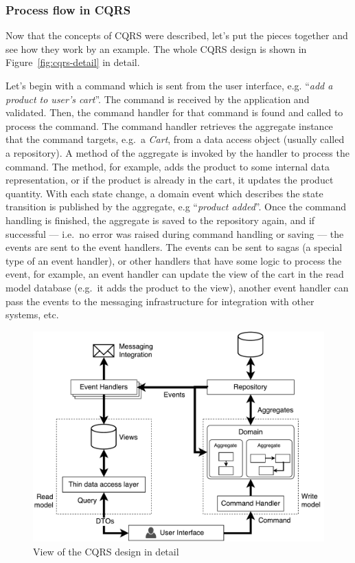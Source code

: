 \documentclass{book}
\begin{document}
\subsubsection{Process flow in CQRS}\label{process-flow-in-cqrs}

Now that the concepts of CQRS were described, let's put the pieces
together and see how they work by an example. The whole CQRS design is
shown in Figure~\ref{fig:cqrs-detail} in detail.

Let's begin with a command which is sent from the user interface, e.g.
``\emph{add a product to user's cart}''. The command is received by the
application and validated. Then, the command handler for that command is
found and called to process the command. The command handler retrieves
the aggregate instance that the command targets, e.g.~a \emph{Cart},
from a data access object (usually called a repository). A method of the
aggregate is invoked by the handler to process the command. The method,
for example, adds the product to some internal data representation, or
if the product is already in the cart, it updates the product quantity.
With each state change, a domain event which describes the state
transition is published by the aggregate, e.g ``\emph{product added}''.
Once the command handling is finished, the aggregate is saved to the
repository again, and if successful --- i.e.~no error was raised during
command handling or saving --- the events are sent to the event
handlers. The events can be sent to sagas (a special type of an event
handler), or other handlers that have some logic to process the event,
for example, an event handler can update the view of the cart in the
read model database (e.g.~it adds the product to the view), another
event handler can pass the events to the messaging infrastructure for
integration with other systems, etc.


\begin{figure}[h!]
\begin{center}
\includegraphics[width=1\columnwidth]{figures/cqrs-detail/cqrs-detail}
\caption{View of the CQRS design in detail%
}
\end{center}
\end{figure}
\end{document}
